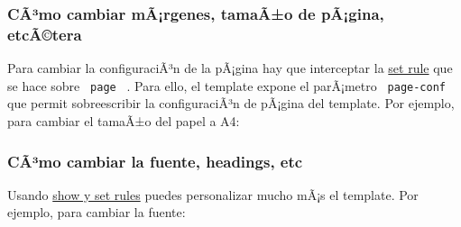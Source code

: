 \subsubsection{CÃ³mo cambiar mÃ¡rgenes, tamaÃ±o de pÃ¡gina,
etcÃ©tera}\label{cuxe3uxb3mo-cambiar-muxe3rgenes-tamauxe3o-de-puxe3gina-etcuxe3tera}

Para cambiar la configuraciÃ³n de la pÃ¡gina hay que interceptar la
\href{https://typst.app/docs/reference/styling/\#set-rules}{set rule}
que se hace sobre \texttt{\ page\ } . Para ello, el template expone el
parÃ¡metro \texttt{\ page-conf\ } que permit sobreescribir la
configuraciÃ³n de pÃ¡gina del template. Por ejemplo, para cambiar el
tamaÃ±o del papel a A4:

\begin{Shaded}
\begin{Highlighting}[]

\NormalTok{)}
\end{Highlighting}
\end{Shaded}

\subsubsection{CÃ³mo cambiar la fuente, headings,
etc}\label{cuxe3uxb3mo-cambiar-la-fuente-headings-etc}

Usando \href{https://typst.app/docs/reference/styling/}{show y set
rules} puedes personalizar mucho mÃ¡s el template. Por ejemplo, para
cambiar la fuente:

\begin{Shaded}
\begin{Highlighting}[]


\NormalTok{)}
\end{Highlighting}
\end{Shaded}

